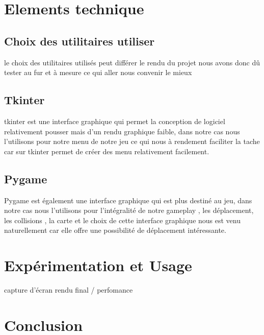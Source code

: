 \documentclass[a4paper, 11pt]{article}
\begin{document}
\section{Elements technique}

\subsection{Choix des utilitaires utiliser}

le choix des utilitaires utilisés peut différer le rendu du projet nous avons donc dû tester au fur et à mesure ce qui aller nous convenir le mieux

\subsection{Tkinter}
tkinter est une interface graphique qui permet la conception de logiciel relativement pousser mais d'un rendu graphique faible, dans notre cas nous l'utilisons pour notre menu de notre jeu ce qui nous à rendement faciliter la tache car sur tkinter permet de créer des menu relativement facilement.
\subsection{Pygame}
Pygame est également une interface graphique qui est plus destiné au jeu,
dans notre cas nous l'utilisons pour l'intégralité de notre gameplay , les déplacement, les collisions , la carte et le choix de cette interface graphique nous est venu naturellement car elle offre une possibilité de déplacement intéressante.

\section{Expérimentation et Usage}
capture d'écran rendu final / perfomance 

\section{Conclusion}
\end{document}
